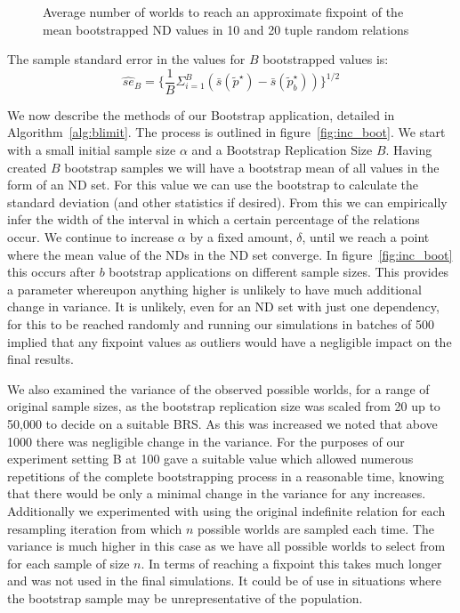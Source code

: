 \begin{figure}
\centerline{}
\caption{\label{graph:linboot} {Average number of worlds to
reach an approximate fixpoint of the mean bootstrapped ND values in 10
and 20 tuple random relations}}
\end{figure}


\begin{definition}
\begin{rm}
The sample \linebreak[4] standard error in the values for $B$ bootstrapped
values is:
\begin{displaymath}
\hat{se}_B = \{ \frac{1}{B}\Sigma_{i = 1}^{B}(\bar{s}(\tilde{p}^\star) - \bar{s}(\tilde{p}^\star_b)) \}^{1/2}
\end{displaymath}
\end{rm}
\end{definition}

We now describe the methods of our Bootstrap application, detailed in
Algorithm~\ref{alg:blimit}. The process is outlined in
figure~\ref{fig:inc_boot}.
We start with a small initial sample size $\alpha$ and a 
Bootstrap Replication Size $B$. 
Having created $B$ bootstrap samples we will have a bootstrap
mean of all values in the form of an ND set. For this value
we can use the bootstrap to calculate the standard deviation
(and other statistics if desired). From this we can empirically infer the width of the interval
in which a certain percentage of the relations occur. We continue
to increase $\alpha$ by a fixed amount, $\delta$, until we reach 
a point where
the mean value of the NDs in the ND set converge. In
figure~\ref{fig:inc_boot} this occurs after $b$ bootstrap applications
on different sample sizes. This 
provides a parameter whereupon anything higher is unlikely to have 
much additional change in variance. It is unlikely, even for an ND set with
just one dependency, for this to be reached randomly and running
our simulations in batches of 500 implied that any fixpoint values as 
outliers would have a negligible impact on the final results.

\medskip

We also examined the variance of the
observed possible worlds, for a range of original sample sizes,
 as the bootstrap replication
size was scaled from 20 up to 50,000 to decide on a suitable BRS. 
As this was increased we noted that
above 1000 there was negligible change in the variance. For the purposes
of our experiment setting B at 100 gave a suitable value
which allowed numerous repetitions of the complete bootstrapping process
in a reasonable time, knowing that there would be only a minimal change
in the variance for any increases. Additionally we experimented with 
using the original indefinite 
relation for each resampling iteration from which $n$ possible worlds are
sampled each time. The variance is much higher in this case as we
have all possible worlds to select from for each sample of size $n$.
In terms of reaching a fixpoint this takes much longer and was not used
in the final simulations. It could be of use
in situations where the
bootstrap sample may be unrepresentative of the population.


